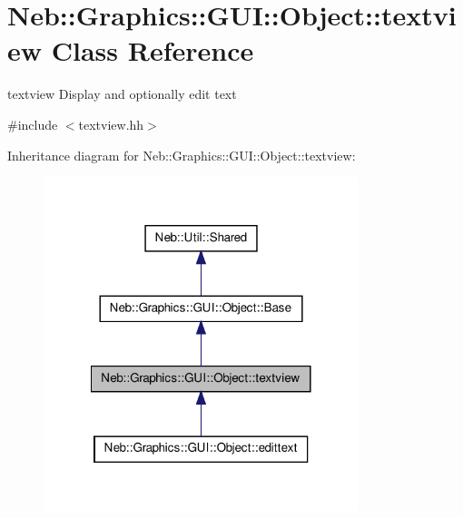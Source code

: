\hypertarget{classNeb_1_1Graphics_1_1GUI_1_1Object_1_1textview}{\section{\-Neb\-:\-:\-Graphics\-:\-:\-G\-U\-I\-:\-:\-Object\-:\-:textview \-Class \-Reference}
\label{classNeb_1_1Graphics_1_1GUI_1_1Object_1_1textview}
}


textview \-Display and optionally edit text  




{\ttfamily \#include $<$textview.\-hh$>$}



\-Inheritance diagram for \-Neb\-:\-:\-Graphics\-:\-:\-G\-U\-I\-:\-:\-Object\-:\-:textview\-:\nopagebreak
\begin{figure}[H]
\begin{center}
\leavevmode
\includegraphics[width=260pt]{classNeb_1_1Graphics_1_1GUI_1_1Object_1_1textview__inherit__graph}
\end{center}
\end{figure}


